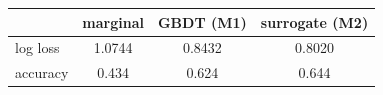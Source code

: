 \begin{tabular}{lccc}
\toprule
 & marginal & GBDT (M1) & surrogate (M2) \\
\midrule
log loss & 1.0744 & 0.8432 & 0.8020 \\
accuracy & 0.434 & 0.624 & 0.644 \\
\bottomrule
\end{tabular}
